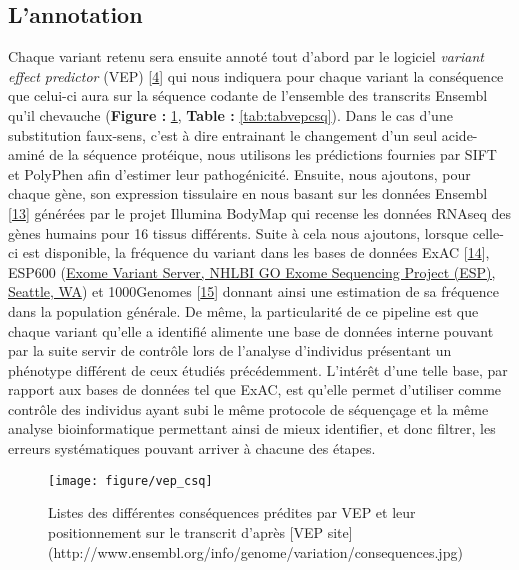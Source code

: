 \documentclass[12pt,twoside]{reedthesis}
\theoremstyle{definition}
\theoremstyle{definition}
\theoremstyle{remark}
\begin{document}
  \newpage
  
  \subsection{L'annotation}\label{lannotation}
  
  Chaque variant retenu sera ensuite annoté tout d'abord par le logiciel
  \emph{variant effect predictor} (VEP)
  {[}\protect\hyperlink{ref-McLaren2016}{4}{]} qui nous indiquera pour
  chaque variant la conséquence que celui-ci aura sur la séquence codante
  de l'ensemble des transcrits Ensembl qu'il chevauche (\textbf{Figure :
  }\ref{fig:figvepcsq}, \textbf{Table : }\ref{tab:tabvepcsq}). Dans le cas
  d'une substitution faux-sens, c'est à dire entrainant le changement d'un
  seul acide-aminé de la séquence protéique, nous utilisons les
  prédictions fournies par SIFT et PolyPhen afin d'estimer leur
  pathogénicité. Ensuite, nous ajoutons, pour chaque gène, son expression
  tissulaire en nous basant sur les données Ensembl
  {[}\protect\hyperlink{ref-Aken2017}{13}{]} générées par le projet
  Illumina BodyMap qui recense les données RNAseq des gènes humains pour
  16 tissus différents. Suite à cela nous ajoutons, lorsque celle-ci est
  disponible, la fréquence du variant dans les bases de données ExAC
  {[}\protect\hyperlink{ref-Lek2016}{14}{]}, ESP600
  (\href{http://evs.gs.washington.edu/EVS/}{Exome Variant Server, NHLBI GO
  Exome Sequencing Project (ESP), Seattle, WA}) et 1000Genomes
  {[}\protect\hyperlink{ref-1000GenomesProjectConsortium2015}{15}{]}
  donnant ainsi une estimation de sa fréquence dans la population
  générale. De même, la particularité de ce pipeline est que chaque
  variant qu'elle a identifié alimente une base de données interne pouvant
  par la suite servir de contrôle lors de l'analyse d'individus présentant
  un phénotype différent de ceux étudiés précédemment. L'intérêt d'une
  telle base, par rapport aux bases de données tel que ExAC, est qu'elle
  permet d'utiliser comme contrôle des individus ayant subi le même
  protocole de séquençage et la même analyse bioinformatique permettant
  ainsi de mieux identifier, et donc filtrer, les erreurs systématiques
  pouvant arriver à chacune des étapes.
  
  \begin{figure}
  
  {\centering \texttt{[image: figure/vep\_csq]} 
  
  }
  
  \caption[Listes des différentes conséquences prédites par VEP et leur positionnement sur le transcrit]{Listes des différentes conséquences prédites par VEP et leur positionnement sur le transcrit d'après [VEP site](http://www.ensembl.org/info/genome/variation/consequences.jpg)}\label{fig:figvepcsq}
  \end{figure}
  
\end{document}
